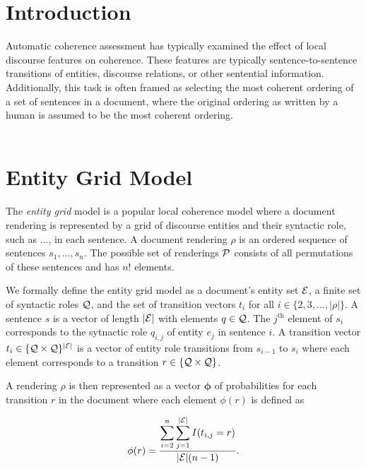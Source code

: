 \documentclass{article}
\newcommand{\entities}{{\cal E}}
\newcommand{\roles}{{\cal Q}}
\newcommand{\role}{q}
\newcommand{\tv}{t}
\newcommand{\sent}{s}
\newcommand{\rendering}{\rho}
\newcommand{\renderings}{{\cal P}}
\newcommand{\trans}{r}
\begin{document}
\section{Introduction}
Automatic coherence assessment has typically examined the effect of local discourse features on coherence. These features are typically sentence-to-sentence transitions of entities, discourse relations, or other sentential information. 
Additionally, this task is often framed as selecting the most coherent ordering of a set of sentences in a document, where the original ordering as written by a human is assumed to be the most coherent ordering.\\\\



\section{Entity Grid Model}

The {\em entity grid} model is a popular local coherence model where a document rendering is represented by a grid of discourse entities and their syntactic role, such as ..., in each sentence. A document rendering $\rendering$ is an ordered sequence of sentences $\sent_1, \ldots, \sent_n$.
The possible set of renderings $\renderings$ consists of all permutations of these sentences and has $n!$ elements.

We formally define the entity grid model as a document's entity set $\entities$, a finite set of syntactic roles $\roles$, and the set of transition vectors $\tv_i$  for all $ i \in \{ 2, 3, \ldots, |\rendering|\}$. 
A sentence $\sent$ is a vector of length $|\entities|$ with elements $\role \in \roles$.
The $j^{\textrm{th}}$ element of $\sent_i$ corresponds to the sytnactic role $\role_{i,j}$ of entity $e_j$ in sentence $i$.
A transition vector $\tv_i \in \{\roles\times\roles\}^{|\entities|}$ is a vector of entity role transitions from $\sent_{i-1}$ to $\sent_i$ where each element corresponds to a transition   $\trans \in \{\roles\times\roles\}$.



\indent A rendering $\rendering$ is then represented as a vector $\boldsymbol{\phi}$ of probabilities for each transition $\trans$ in the document where each element $\phi(r)$ is defined as  

\begin{equation}
\phi(\trans) = \frac{ \displaystyle \sum_{i = 2}^n \sum_{j=1}^{|\entities|} I(\tv_{i,j}= r)  }{|\entities|(n-1)}. 
\end{equation}
\end{document}
